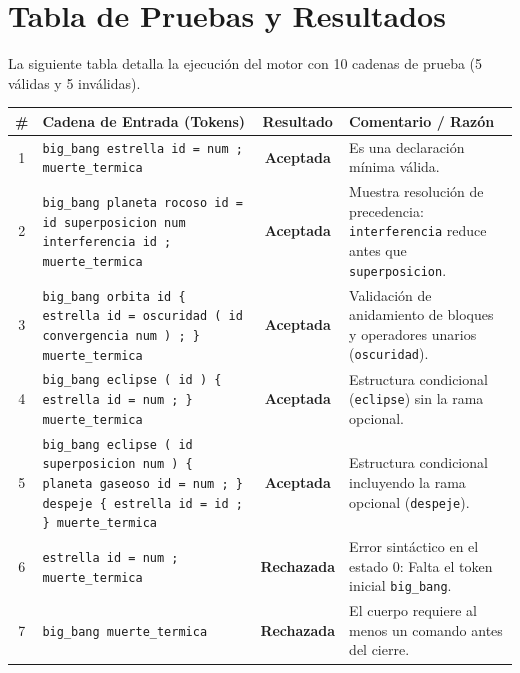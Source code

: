 \documentclass[12pt, letterpaper]{article}
\begin{document}
\newpage

\section{Tabla de Pruebas y Resultados}

La siguiente tabla detalla la ejecución del motor con 10 cadenas de prueba (5 válidas y 5 inválidas).

\begin{table}[h!]
\centering
\small
\renewcommand{\arraystretch}{1.4}
\begin{tabular}{c p{6cm} c p{4.5cm}}
\toprule
\textbf{\#} & \textbf{Cadena de Entrada (Tokens)} & \textbf{Resultado} & \textbf{Comentario / Razón} \\
\midrule
1 & \texttt{big\_bang estrella id = num ; muerte\_termica} & \textbf{\color{primary}Aceptada} & Es una declaración mínima válida. \\

2 & \texttt{big\_bang planeta rocoso id = id superposicion num interferencia id ; muerte\_termica} & \textbf{\color{primary}Aceptada} & Muestra resolución de precedencia: \texttt{interferencia} reduce antes que \texttt{superposicion}. \\

3 & \texttt{big\_bang orbita id \{ estrella id = oscuridad ( id convergencia num ) ; \} muerte\_termica} & \textbf{\color{primary}Aceptada} & Validación de anidamiento de bloques y operadores unarios (\texttt{oscuridad}). \\

4 & \texttt{big\_bang eclipse ( id ) \{ estrella id = num ; \} muerte\_termica} & \textbf{\color{primary}Aceptada} & Estructura condicional (\texttt{eclipse}) sin la rama opcional. \\

5 & \texttt{big\_bang eclipse ( id superposicion num ) \{ planeta gaseoso id = num ; \} despeje \{ estrella id = id ; \} muerte\_termica} & \textbf{\color{primary}Aceptada} & Estructura condicional incluyendo la rama opcional (\texttt{despeje}). \\

6 & \texttt{estrella id = num ; muerte\_termica} & \textbf{\color{accent}Rechazada} & Error sintáctico en el estado 0: Falta el token inicial \texttt{big\_bang}. \\

7 & \texttt{big\_bang muerte\_termica} & \textbf{\color{accent}Rechazada} & El cuerpo requiere al menos un comando antes del cierre. \\


\end{tabular}
\end{table}
\end{document}
